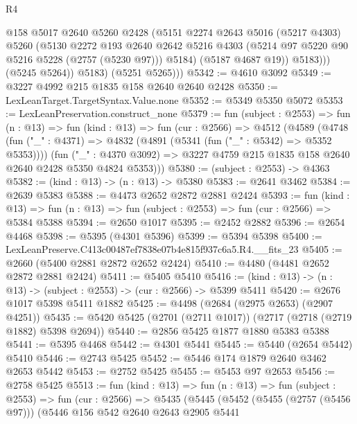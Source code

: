 \begin{lexlean}{R4}
\begin{coremodule}
                  @158
                  @5017
                  @2640
                  @5260
                  @2428
                  (@5151
                    @2274
                    @2643
                    @5016
                    (@5217 @4303)
                    @5260
                    (@5130
                      @2272
                      @193
                      @2640
                      @2642
                      @5216
                      @4303
                      (@5214 @97 @5220 @90 @5216 @5228 (@2757 (@5230 @97)))
                      @5184)
                    (@5187 @4687 @19))
                  @5183)))
            (@5245 @5264))
          @5183)
        (@5251 @5265)))
@5342 := @4610 @3092
@5349 := @3227 @4992 @215 @1835 @158 @2640 @2640 @2428
@5350 := LexLeanTarget.TargetSyntax.Value.none
@5352 := @5349 @5350 @5072
@5353 := LexLeanPreservation.construct_none
@5379 := fun (subject : @2553) =>
  fun (n : @13) =>
  fun (kind : @13) =>
  fun (cur : @2566) =>
  @4512
    (@4589
      (@4748
        (fun ("_" : @4371) => @4832 (@4891 (@5341 (fun ("_" : @5342) => @5352 @5353))))
        (fun ("_" : @4370 @3092) =>
        @3227 @4759 @215 @1835 @158 @2640 @2640 @2428 @5350 @4824 @5353)))
@5380 := (subject : @2553) -> @4363
@5382 := (kind : @13) -> (n : @13) -> @5380
@5383 := @2641 @3462
@5384 := @2639 @5383
@5388 := @4473 @2652 @2872 @2881 @2424
@5393 := fun (kind : @13) =>
  fun (n : @13) => fun (subject : @2553) => fun (cur : @2566) => @5384 @5388
@5394 := @2650 @1017
@5395 := @2452 @2882
@5396 := @2654 @4468
@5398 := @5395 (@4301 @5396)
@5399 := @5394 @5398
@5400 := LexLeanPreserve.C413c00487ef7838e07b4e815f937c6a5.R4.__fits_23
@5405 := @2660 (@5400 @2881 @2872 @2652 @2424)
@5410 := @4480 (@4481 @2652 @2872 @2881 @2424)
@5411 := @5405 @5410
@5416 := (kind : @13) -> (n : @13) -> (subject : @2553) -> (cur : @2566) -> @5399 @5411
@5420 := @2676 @1017 @5398 @5411 @1882
@5425 := @4498 (@2684 (@2975 @2653) (@2907 @4251))
@5435 := @5420 @5425 (@2701 (@2711 @1017)) (@2717 (@2718 (@2719 @1882) @5398 @2694))
@5440 := @2856 @5425 @1877 @1880 @5383 @5388
@5441 := @5395 @4468
@5442 := @4301 @5441
@5445 := @5440 (@2654 @5442) @5410
@5446 := @2743 @5425
@5452 := @5446 @174 @1879 @2640 @3462 @2653 @5442
@5453 := @2752 @5425
@5455 := @5453 @97 @2653
@5456 := @2758 @5425
@5513 := fun (kind : @13) =>
  fun (n : @13) =>
  fun (subject : @2553) =>
  fun (cur : @2566) =>
  @5435
    (@5445
      (@5452
        (@5455 (@2757 (@5456 @97)))
        (@5446
          @156
          @542
          @2640
          @2643
          @2905
          @5441

\end{coremodule}
\end{lexlean}
